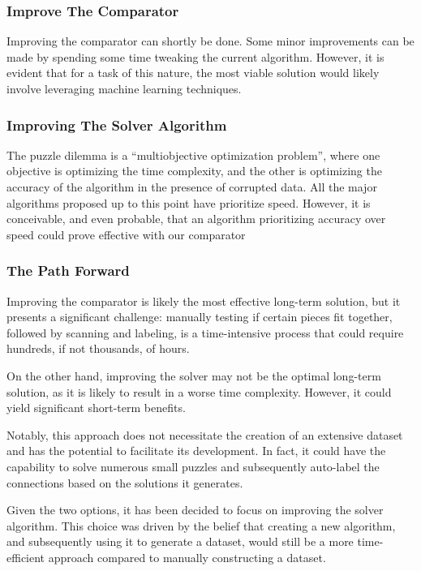 \documentclass{article}
\begin{document}
\subsubsection{Improve The Comparator}
	
Improving the comparator can shortly be done.
Some minor improvements can be made by spending some time
tweaking the current algorithm.
However, it is evident that for a task of this nature,
the most viable solution would likely involve
leveraging machine learning techniques.

\subsubsection{Improving The Solver Algorithm}

The puzzle dilemma is a ``multiobjective optimization problem'',
where one objective is optimizing the time complexity,
and the other is optimizing the accuracy of the algorithm
in the presence of corrupted data.
All the major algorithms proposed up to this point have prioritize speed.
However, it is conceivable, and even probable,
that an algorithm prioritizing accuracy over speed could prove
effective with our comparator

\subsubsection{The Path Forward}

Improving the comparator is likely the most effective long-term solution,
but it presents a significant challenge: manually testing if certain
pieces fit together, followed by scanning and labeling,
is a time-intensive process that could require hundreds,
if not thousands, of hours.

On the other hand, improving the solver may not be the optimal long-term
solution, as it is likely to result in a worse time complexity.
However, it could yield significant short-term benefits.

Notably, this approach does not necessitate the creation of an extensive dataset
and has the potential to facilitate its development.
In fact, it could have the capability to solve numerous small
puzzles and subsequently auto-label the connections
based on the solutions it generates.

Given the two options, it has been decided to focus on improving
the solver algorithm. This choice was driven by the belief
that creating a new algorithm, and subsequently using it to
generate a dataset, would still be a more time-efficient
approach compared to manually constructing a dataset.
\end{document}
